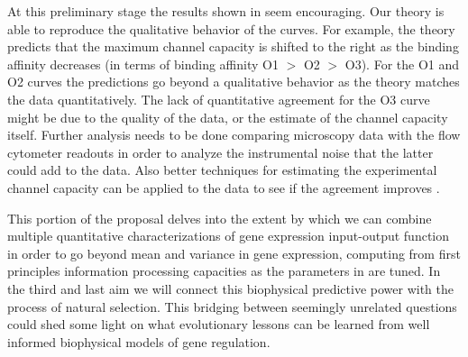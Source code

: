 
At this preliminary stage the results shown in  seem
encouraging. Our theory is able to reproduce the qualitative behavior of the
curves. For example, the theory predicts that the maximum channel capacity is
shifted to the right as the binding affinity decreases (in terms of binding
affinity O1 $>$ O2 $>$ O3). For the O1 and O2 curves the predictions go beyond a
qualitative behavior as the theory matches the data quantitatively. The lack of
quantitative agreement for the O3 curve might be due to the quality of the data,
or the estimate of the channel capacity itself. Further analysis needs to be
done comparing microscopy data with the flow cytometer readouts in order to
analyze the instrumental noise that the latter could add to the data. Also
better techniques for estimating the experimental channel capacity can be
applied to the data to see if the agreement improves \cite{Cheong2011}.

This portion of the proposal delves into the extent by which we can combine
multiple quantitative characterizations of gene expression input-output function
in order to go beyond mean and variance in gene expression, computing from first
principles information processing capacities as the parameters in
 are tuned. In the third and last aim we will connect this
biophysical predictive power with the process of natural selection. This
bridging between seemingly unrelated questions could shed some light on what
evolutionary lessons can be learned from well informed biophysical models of
gene regulation.
